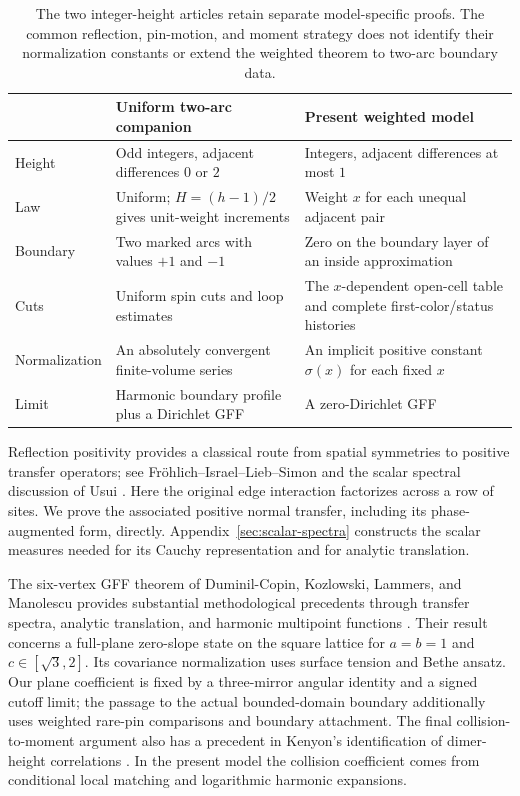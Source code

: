 \documentclass[11pt]{article}
\theoremstyle{definition}
\theoremstyle{remark}
\numberwithin{equation}{section}
\begin{document}
\begin{table}[!htbp]

\small
\renewcommand{\arraystretch}{1.22}
\begin{tabular}{p{}p{}p{}}
\hline
 & Uniform two-arc companion & Present weighted model \\
\hline
Height & Odd integers, adjacent differences $0$ or $2$ &
Integers, adjacent differences at most $1$ \\
Law & Uniform; $H=(h-1)/2$ gives unit-weight increments &
Weight $x$ for each unequal adjacent pair \\
Boundary & Two marked arcs with values $+1$ and $-1$ &
Zero on the boundary layer of an inside approximation \\
Cuts & Uniform spin cuts and loop estimates &
The $x$-dependent open-cell table and complete first-color/status histories \\
Normalization & An absolutely convergent finite-volume series &
An implicit positive constant $\sigma(x)$ for each fixed $x$ \\
Limit & Harmonic boundary profile plus a Dirichlet GFF &
A zero-Dirichlet GFF \\
\hline
\end{tabular}
\caption{The two integer-height articles retain separate model-specific
proofs.  The common reflection, pin-motion, and moment strategy does not
identify their normalization constants or extend the weighted theorem
to two-arc boundary data.}
\label{tab:integer-models}
\end{table}
\FloatBarrier

Reflection positivity provides a classical route from spatial symmetries
to positive transfer operators; see Fr\"ohlich--Israel--Lieb--Simon
\cite{FILS1978} and the scalar spectral discussion of Usui
\cite[Sections~3--4]{Usui2012}.  Here the original edge interaction
factorizes across a row of sites.  We prove the associated positive
normal transfer, including its phase-augmented form, directly.
Appendix~\ref{sec:scalar-spectra} constructs the scalar measures needed
for its Cauchy representation and for analytic translation.

The six-vertex GFF theorem of Duminil-Copin, Kozlowski, Lammers, and
Manolescu provides substantial methodological precedents through transfer
spectra, analytic translation, and harmonic multipoint functions
\cite[Section~4.5; Lemma~7.4; Section~7.2]{DCKLM2026}.  Their result concerns a
full-plane zero-slope state on the square lattice for
$a=b=1$ and $c\in[\sqrt3,2]$.  Its covariance normalization uses
surface tension and Bethe ansatz.  Our plane coefficient is fixed by a
three-mirror angular identity and a signed cutoff limit; the passage to
the actual bounded-domain boundary additionally uses weighted rare-pin
comparisons and boundary attachment.  The final collision-to-moment
argument also has a precedent in Kenyon's identification of dimer-height
correlations \cite[Lemma~3.1 and Proposition~3.2]{Kenyon2001}.  In the present model the
collision coefficient comes from conditional local matching and
logarithmic harmonic expansions.
\end{document}
